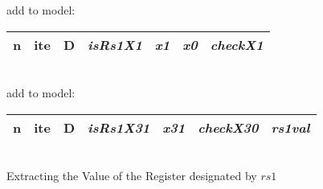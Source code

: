 \begin{algorithm}
    add to model:\\
    \begin{tabular}[h]{>{\ttfamily\color{UniRed}}r >{\ttfamily}l >{\ttfamily\color{UniGrey}}l >{\slshape\color{UniRed}}l >{\slshape\color{UniRed}}l >{\slshape\color{UniRed}}l >{\slshape} l}
        \hline
        \hline
        n & ite & D & isRs1X1 & x1 & x0 & checkX1 \\
        \hline
        \hline
    \end{tabular}\\
    \BlankLine
    add to model:\\
    \begin{tabular}[h]{>{\ttfamily\color{UniRed}}r >{\ttfamily}l >{\ttfamily\color{UniGrey}}l >{\slshape\color{UniRed}}l >{\slshape\color{UniRed}}l >{\slshape\color{UniRed}}l >{\slshape} l}
        \hline
        \hline
        n & ite & D & isRs1X31 & x31 & checkX30 & rs1val \\
        \hline
        \hline
    \end{tabular}\\

    \caption[Value Extraction from $rs1$]{Extracting the Value of the
        Register designated by $rs1$} \label{alg:extractrs1val}
\end{algorithm}